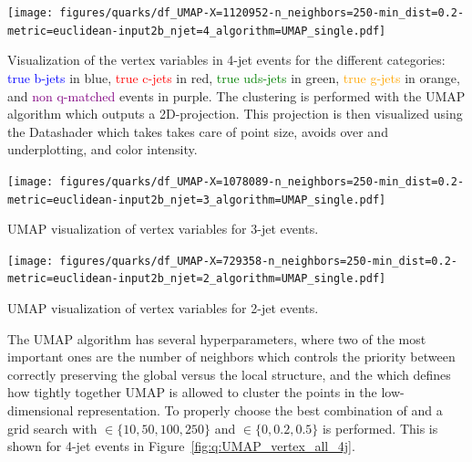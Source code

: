 \begin{marginfigure}[-13cm]
  \centerfloat
  \texttt{[image: figures/quarks/df\_UMAP-X=1120952-n\_neighbors=250-min\_dist=0.2-metric=euclidean-input2b\_njet=4\_algorithm=UMAP\_single.pdf]}
  \vspace{1mm}
  \caption[UMAP visualization of vertex variables for 4-jet events]
          {Visualization of the vertex variables in 4-jet events for the different categories: \textcolor{blue}{true b-jets} in blue, \textcolor{red}{true c-jets} in red, \textcolor{green}{true uds-jets} in green, \textcolor{orange}{true g-jets} in orange, and \textcolor{purple}{non q-matched} events in purple. The clustering is performed with the UMAP algorithm which outputs a 2D-projection. This projection is then visualized using the Datashader which takes takes care of point size, avoids over and underplotting, and color intensity.} 
  \label{fig:q:UMAP_vertex_4j}
  \vspace{5mm}
\end{marginfigure}

\begin{marginfigure}[-2cm]
  \centerfloat
  \texttt{[image: figures/quarks/df\_UMAP-X=1078089-n\_neighbors=250-min\_dist=0.2-metric=euclidean-input2b\_njet=3\_algorithm=UMAP\_single.pdf]}
  \vspace{1mm}
  \caption[UMAP visualization of vertex variables for 3-jet events]
          {UMAP visualization of vertex variables for 3-jet events.} 
  \label{fig:q:UMAP_vertex_3j}
\end{marginfigure}

\begin{marginfigure}[0.5cm]
  \centerfloat
  \texttt{[image: figures/quarks/df\_UMAP-X=729358-n\_neighbors=250-min\_dist=0.2-metric=euclidean-input2b\_njet=2\_algorithm=UMAP\_single.pdf]}
  \vspace{1mm}
  \caption[UMAP visualization of vertex variables for 2-jet events]
          {UMAP visualization of vertex variables for 2-jet events.} 
  \label{fig:q:UMAP_vertex_2j}
\end{marginfigure}

The UMAP algorithm has several hyperparameters, where two of the most important ones are the number of neighbors  which controls the priority between correctly preserving the global versus the local structure, and the  which defines how tightly together UMAP is allowed to cluster the points in the low-dimensional representation. To properly choose the best combination of  and  a grid search with  ${\in \{10, 50, 100, 250 \}}$ and $\in \{0, 0.2, 0.5\}$ is performed. This is shown for 4-jet events in Figure~\ref{fig:q:UMAP_vertex_all_4j}. 

